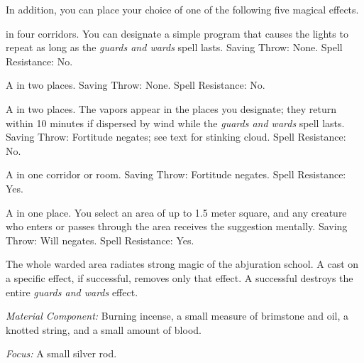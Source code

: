 {	In addition, you can place your choice of one of the following five magical effects.

	\begin{enumerate*}
		\item {} in four corridors. You can designate a simple program that causes the lights to repeat as long as the \emph{guards and wards} spell lasts. Saving Throw: None. Spell Resistance: No.
		\item A  in two places. Saving Throw: None. Spell Resistance: No.
		\item A  in two places. The vapors appear in the places you designate; they return within 10 minutes if dispersed by wind while the \emph{guards and wards} spell lasts. Saving Throw: Fortitude negates; see text for stinking cloud. Spell Resistance: No.
		\item A  in one corridor or room. Saving Throw: Fortitude negates. Spell Resistance: Yes.
		\item A  in one place. You select an area of up to 1.5 meter square, and any creature who enters or passes through the area receives the suggestion mentally. Saving Throw: Will negates. Spell Resistance: Yes.
	\end{enumerate*}

	The whole warded area radiates strong magic of the abjuration school. A  cast on a specific effect, if successful, removes only that effect. A successful  destroys the entire \emph{guards and wards} effect.

	\textit{Material Component:}
	Burning incense, a small measure of brimstone and oil, a knotted string, and a small amount of blood.

	\textit{Focus:}
	A small silver rod.

}
